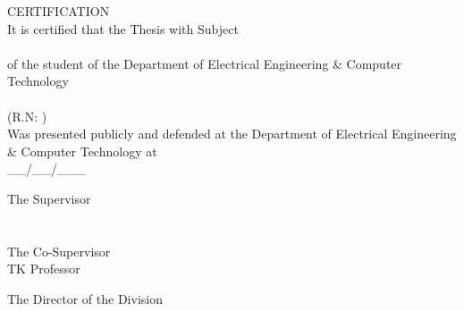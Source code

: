\pagestyle{empty}
\begin{center}
{\LARGE CERTIFICATION\\[1cm]}
\large It is certified that the Thesis with Subject\\[1cm]
\textbf{\large \doctitle }\\[1cm]
of the student of the Department of Electrical Engineering \& Computer Technology\\[1.5cm]
\me \\[0.5cm]
(R.N: \studnum )\\[1.5cm]
Was presented publicly and defended at the Department of Electrical Engineering \& Computer Technology at\\[1cm]
\Large{\_\_/\_\_/\_\_\_}\\[1.5cm]
\end{center}
\begin{minipage}{0.5\textwidth}
\begin{flushleft} \large
The Supervisor\\[2cm]
\supname \\
\emph{\suptitle}\\[1cm]
The Co-Supervisor\\[2cm]
TK
\newline Professor

\end{flushleft}
\end{minipage}
\begin{minipage}{0.5\textwidth}
\begin{flushright} \large
The Director of the Division\\[4cm]
\headofdivision\\
\emph{\headofdivisiontitle}
\end{flushright}
\end{minipage}
